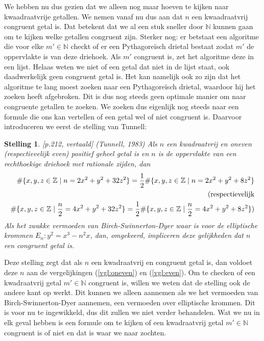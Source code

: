 \documentclass[12pt,reqno]{article}
\newcommand*{\NN}{\ensuremath{\mathbb{N}}}
\newcommand*{\ZZ}{\ensuremath{\mathbb{Z}}}
\theoremstyle{theorem}
\newtheorem{theorem}{Stelling}
\theoremstyle{definition}
\begin{document}
	We hebben nu dus gezien dat we alleen nog maar hoeven te kijken naar kwaadraatvrije getallen. We nemen vanaf nu dus aan dat $n$ een kwaadraatvrij congruent getal is. Dat betekent dat we al een stuk sneller door $\NN$ kunnen gaan om te kijken welke getallen congruent zijn. Sterker nog: er betstaat een algoritme die voor elke $m'\in\NN$ checkt of er een Pythagore\"isch drietal bestaat zodat $m'$ de oppervlakte is van deze driehoek. Als $m'$ congruent is, zet het algoritme deze in een lijst. Helaas weten we niet of een getal dat niet in de lijst staat, ook daadwerkelijk geen congruent getal is. Het kan namelijk ook zo zijn dat het algoritme te lang moest zoeken naar een Pythagore\"isch drietal, waardoor hij het zoeken heeft afgebroken. Dit is dus nog steeds geen optimale manier om naar congruente getallen te zoeken. We zoeken dus eigenlijk nog steeds naar een formule die ons kan vertellen of een getal wel of niet congruent is. Daarvoor introduceren we eerst de stelling van Tunnell:
	\begin{theorem}\label{def:tunnell}
		\cite{Koblitz}[p.212, vertaald] (Tunnell, 1983) Als $n$ een kwadraatvrij en oneven (respectievelijk even) positief geheel getal is en $n$ is de oppervlakte van een rechthoekige driehoek met rationale zijden, dan
		\begin{align}
		\label{vgl:oneven} \#\{x,y,z\in\ZZ \mid n=2x^2+y^2+32z^2\} = \frac{1}{2} \#\{x,y,z\in\ZZ \mid n=2x^2+y^2+8z^2\}\\
		\notag \text{(respectievelijk} \\
		\label{vgl:even} \#\{x,y,z\in\ZZ \mid \frac{n}{2}=4x^2+y^2+32z^2\} = \frac{1}{2} \#\{x,y,z\in\ZZ \mid \frac{n}{2}=4x^2+y^2+8z^2\})
		\end{align}
		Als het zwakke vermoeden van Birch-Swinnerton-Dyer waar is voor de elliptische krommen $E_n:y^2=x^3-n^2x$, dan, omgekeerd, impliceren deze gelijkheden dat $n$ een congruent getal is.
	\end{theorem}
	\noindent Deze stelling zegt dat als $n$ een kwadraatvrij en congruent getal is, dan voldoet deze $n$ aan de vergelijkingen (\ref{vgl:oneven}) en (\ref{vgl:even}). Om te checken of een kwadraatvrij getal $m'\in\NN$ congruent is, willen we weten dat de stelling ook de andere kant op werkt. Dit kunnen we alleen aannemen als we het vermoeden van Birch-Swinnerton-Dyer aannemen, een vermoeden over elliptische krommen. Dit is voor nu te ingewikkeld, dus dit zullen we niet verder behandelen. Wat we nu in elk geval hebben is een formule om te kijken of een kwadraatvrij getal $m'\in\NN$ congruent is of niet en dat is waar we naar zochten.
	
\end{document}
